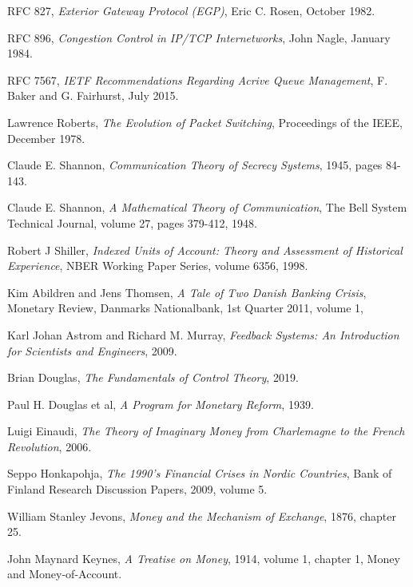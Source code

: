 \begin{thebibliography}{9}
    RFC 827,
    \emph{Exterior Gateway Protocol (EGP)},
    Eric C. Rosen,
    October 1982.

    RFC 896,
    \emph{Congestion Control in IP/TCP Internetworks},
    John Nagle,
    January 1984.

    RFC 7567,
    \emph{IETF Recommendations Regarding Acrive Queue Management},
    F. Baker and G. Fairhurst,
    July 2015.

    Lawrence Roberts,
    \emph{The Evolution of Packet Switching},
    Proceedings of the IEEE,
    December 1978.

    Claude E. Shannon,
    \emph{Communication Theory of Secrecy Systems},
    1945,
    pages 84-143.

    Claude E. Shannon,
    \emph{A Mathematical Theory of Communication},
    The Bell System Technical Journal,
    volume 27,
    pages 379-412,
    1948.

    Robert J Shiller,
    \emph{Indexed Units of Account: Theory and Assessment of Historical Experience},
    NBER Working Paper Series,
    volume 6356,
    1998.

    Kim Abildren and Jens Thomsen,
    \emph{A Tale of Two Danish Banking Crisis},
    Monetary Review,
    Danmarks Nationalbank,
    1st Quarter 2011,
    volume 1,

    Karl Johan Astrom and Richard M. Murray,
    \emph{Feedback Systems: An Introduction for Scientists and Engineers},
    2009.

    Brian Douglas,
    \emph{The Fundamentals of Control Theory},
    2019.

    Paul H. Douglas et al,
    \emph{A Program for Monetary Reform},
    1939.

    Luigi Einaudi,
    \emph{The Theory of Imaginary Money from Charlemagne to the French Revolution},
    2006.

    Seppo Honkapohja,
    \emph{The 1990's Financial Crises in Nordic Countries},
    Bank of Finland Research Discussion Papers,
    2009,
    volume 5.

    William Stanley Jevons,
    \emph{Money and the Mechanism of Exchange},
    1876,
    chapter 25.

    John Maynard Keynes,
    \emph{A Treatise on Money},
    1914,
    volume 1,
    chapter 1,
    Money and Money-of-Account.


\end{thebibliography}

